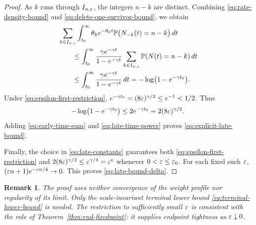 \documentclass[10pt]{article}
\newtheorem{rmk}[thm]{Remark}
\numberwithin{equation}{section}
\begin{document}
\begin{proof}
    As $k$ runs through $I_{n,\varepsilon}$, the integers $n-k$ are distinct.
    Combining \eqref{eq:rate-density-bound} and
    \eqref{eq:delete-one-survivor-bound}, we obtain
    \begin{align}
        &\sum_{k\in I_{n,\varepsilon}}
        \int_{t_0}^{\infty}\theta_k e^{-\theta_k t}
        \mathbb P\bigl(N_{-k}(t)=n-k\bigr)\,dt\notag\\
        &\qquad\leq
        \int_{t_0}^{\infty}
        \frac{\gamma e^{-\gamma t}}{1-e^{-\gamma t}}
        \sum_{k\in I_{n,\varepsilon}}\mathbb P(N(t)=n-k)\,dt\notag\\
        &\qquad\leq
        \int_{t_0}^{\infty}
        \frac{\gamma e^{-\gamma t}}{1-e^{-\gamma t}}\,dt
        =-\log\bigl(1-e^{-\gamma t_0}\bigr).
        \label{eq:late-time-integral}
    \end{align}
    Under \eqref{eq:epsilon-first-restriction},
    $e^{-\gamma t_0}=(8\varepsilon)^{\gamma/2}\leq e^{-1}<1/2$.  Thus
    \begin{equation}\label{eq:late-time-power}
        -\log\bigl(1-e^{-\gamma t_0}\bigr)
        \leq2e^{-\gamma t_0}=2(8\varepsilon)^{\gamma/2}.
    \end{equation}
    Adding \eqref{eq:early-time-sum} and \eqref{eq:late-time-power} proves
    \eqref{eq:explicit-late-bound}.

    Finally, the choice in \eqref{eq:late-constants} guarantees both
    \eqref{eq:epsilon-first-restriction} and
    $2(8\varepsilon)^{\gamma/2}\leq\varepsilon^{\gamma/4}=\varepsilon^{\mathsf c}$ whenever
    $0<\varepsilon\leq\varepsilon_0$.  For each fixed such $\varepsilon$,
    $(\varepsilon n+1)e^{-\varepsilon n/4}\to0$.  This proves
    \eqref{eq:late-bound-delta}.
\end{proof}

\begin{rmk}
    The proof uses neither convergence of the weight profile nor regularity
    of its limit.  Only the scale-invariant terminal lower bound
    \eqref{eq:terminal-lower-bound} is needed.  The restriction to
    sufficiently small $\varepsilon$ is consistent with the role of
    Theorem~\ref{thm:end-fixedpoint}: it supplies endpoint tightness as
    $\varepsilon\downarrow0$.
\end{rmk}

 \footnotesize


\end{document}
